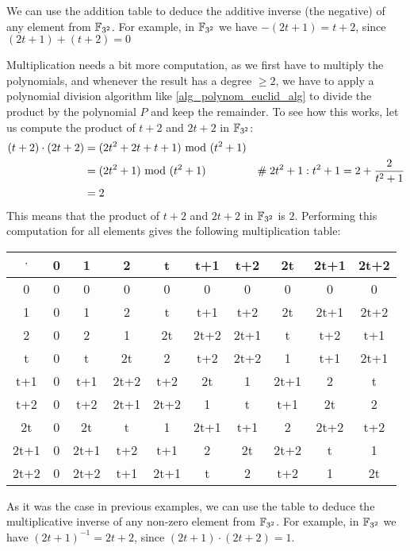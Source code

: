 \begin{example}
We can use the addition table to deduce the additive inverse (the negative) of any element from $\mathbb{F}_{3^2}$. For example, in $\mathbb{F}_{3^2}$ we have $-(2t+1)= t+2$, since $(2t+1) + (t+2)=0$

Multiplication needs a bit more computation, as we first have to multiply the polynomials, and whenever the result has a degree $\geq 2$, we have to apply a polynomial division algorithm like \ref{alg_polynom_euclid_alg} to divide the product by the polynomial $P$ and keep the remainder. To see how this works, let us compute the product of $t+2$ and $2t+2$ in $\mathbb{F}_{3^2}$:
\begin{align*}
(t+2) \cdot (2t+2) &= (2t^2 + 2t + t + 1) \text{ mod } (t^2+1) \\
                   &= (2t^2+1) \text{ mod } (t^2+1) & \#\; 2t^2+1:t^2+1= 2 + \frac{2}{t^2+1} \\
                   &= 2
\end{align*}
This means that the product of $t+2$ and $2t+2$ in $\mathbb{F}_{3^2}$ is $2$. Performing this computation for all elements gives the following multiplication table:
\begin{center}
  \begin{tabular}{c | c c c c c c c c c}
$\cdot$ & 0    & 1    & 2    & t    & t+1  & t+2  & 2t   & 2t+1 & 2t+2 \\\hline
      0 & 0    & 0    & 0    & 0    & 0    & 0    & 0    & 0    & 0 \\
      1 & 0    & 1    & 2    & t    & t+1  & t+2  & 2t   & 2t+1 & 2t+2\\
      2 & 0    & 2    & 1    & 2t   & 2t+2 & 2t+1 & t    & t+2  & t+1 \\
      t & 0    & t    & 2t   & 2    & t+2  & 2t+2 & 1    & t+1  & 2t+1  \\
    t+1 & 0    & t+1  & 2t+2 & t+2  & 2t   & 1    & 2t+1 & 2    & t   \\
    t+2 & 0    & t+2  & 2t+1 & 2t+2 & 1    & t    & t+1  & 2t   & 2    \\
     2t & 0    & 2t   & t    & 1    & 2t+1 & t+1  & 2  & 2t+2 & t+2\\
   2t+1 & 0    & 2t+1 & t+2  & t+1  & 2    & 2t   & 2t+2 & t    & 1    \\
   2t+2 & 0    & 2t+2 & t+1  & 2t+1 & t    & 2    & t+2  & 1     & 2t
  \end{tabular}
\end{center}
As it was the case in previous examples, we can use the table to deduce the multiplicative inverse of any non-zero element from $\mathbb{F}_{3^2}$. For example, in $\mathbb{F}_{3^2}$ we have $(2t+1)^{-1}= 2t+2 $, since $(2t+1) \cdot (2t+2)=1$.


\end{example}
